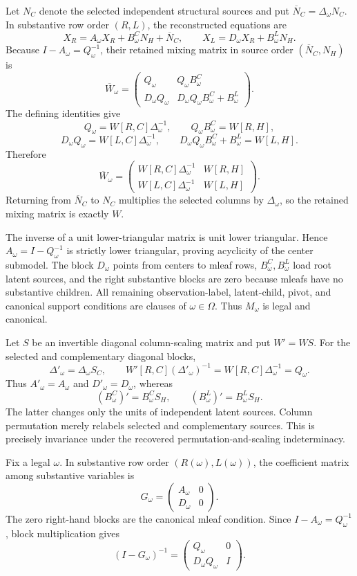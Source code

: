 Let \(N_C\) denote the selected independent structural sources and put \(\overline N_C=\Delta_\omega N_C\). In substantive row order \((R,L)\), the reconstructed equations are
\[
X_R=A_\omega X_R+B^C_\omega N_H+\overline N_C,
\qquad X_L=D_\omega X_R+B^L_\omega N_H.
\]
Because \(I-A_\omega=Q_\omega^{-1}\), their retained mixing matrix in source order \((\overline N_C,N_H)\) is
\[
\overline W_\omega=
\begin{pmatrix}
Q_\omega&Q_\omega B^C_\omega\\
D_\omega Q_\omega&D_\omega Q_\omega B^C_\omega+B^L_\omega
\end{pmatrix}.
\]
The defining identities give
\[
Q_\omega=W[R,C]\Delta_\omega^{-1},\qquad Q_\omega B^C_\omega=W[R,H],
\]
\[
D_\omega Q_\omega=W[L,C]\Delta_\omega^{-1},\qquad
D_\omega Q_\omega B^C_\omega+B^L_\omega=W[L,H].
\]
Therefore
\[
\overline W_\omega=
\begin{pmatrix}
W[R,C]\Delta_\omega^{-1}&W[R,H]\\
W[L,C]\Delta_\omega^{-1}&W[L,H]
\end{pmatrix}.
\]
Returning from \(\overline N_C\) to \(N_C\) multiplies the selected columns by \(\Delta_\omega\), so the retained mixing matrix is exactly \(W\).

The inverse of a unit lower-triangular matrix is unit lower triangular. Hence \(A_\omega=I-Q_\omega^{-1}\) is strictly lower triangular, proving acyclicity of the center submodel. The block \(D_\omega\) points from centers to mleaf rows, \(B^C_\omega,B^L_\omega\) load root latent sources, and the right substantive blocks are zero because mleafs have no substantive children. All remaining observation-label, latent-child, pivot, and canonical support conditions are clauses of \(\omega\in\Omega\). Thus \(M_\omega\) is legal and canonical.

Let \(S\) be an invertible diagonal column-scaling matrix and put \(W'=WS\). For the selected and complementary diagonal blocks,
\[
\Delta'_\omega=\Delta_\omega S_C,
\qquad W'[R,C](\Delta'_\omega)^{-1}=W[R,C]\Delta_\omega^{-1}=Q_\omega.
\]
Thus \(A'_\omega=A_\omega\) and \(D'_\omega=D_\omega\), whereas
\[
(B^C_\omega)'=B^C_\omega S_H,
\qquad (B^L_\omega)'=B^L_\omega S_H.
\]
The latter changes only the units of independent latent sources. Column permutation merely relabels selected and complementary sources. This is precisely invariance under the recovered permutation-and-scaling indeterminacy.

Fix a legal \(\omega\). In substantive row order \((R(\omega),L(\omega))\), the coefficient matrix among substantive variables is
\[
G_\omega=\begin{pmatrix}A_\omega&0\\D_\omega&0\end{pmatrix}.
\]
The zero right-hand blocks are the canonical mleaf condition. Since \(I-A_\omega=Q_\omega^{-1}\), block multiplication gives
\[
(I-G_\omega)^{-1}=\begin{pmatrix}Q_\omega&0\\D_\omega Q_\omega&I\end{pmatrix}.
\]

